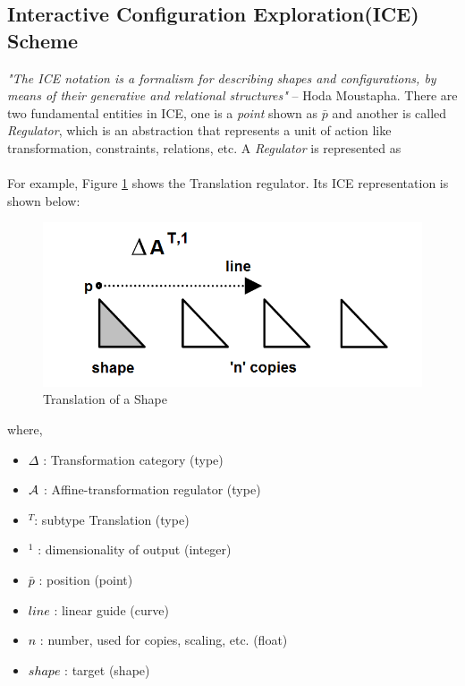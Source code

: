 \subsection{Interactive Configuration Exploration(ICE) Scheme} \label{sec:abstraction:ice}

{\em "The ICE notation is a formalism for describing shapes and  configurations,  by  means  of  their  generative  and  relational  structures"} -- Hoda Moustapha\cite{Hoda2005}.  There are two fundamental entities in ICE, one is a {\em point} shown as $\bar{p}$ and another is called {\em Regulator}, which is an abstraction that represents a unit of action like transformation, constraints, relations, etc. A {\em Regulator} is represented as \\



{}\\

	 For example, Figure \ref{fig:abstraction:hodatranslate} shows the Translation regulator. Its ICE representation is shown below:

	
\begin{figure}[!h]
\centering \includegraphics[width=0.5\linewidth]{../Common/images/hodatranslate} 
\caption{Translation of a Shape}
\label{fig:abstraction:hodatranslate}
\end{figure}

	
	where,
		\begin{itemize}[noitemsep,topsep=0pt,parsep=0pt,partopsep=0pt]
		\item 	\textcolor{black}{$\Delta$} : Transformation category (type)
	     	\item 	\textcolor{black}{${\bf \mathcal{A}}$} : Affine-transformation regulator (type)
		\item  	\textcolor{black}{$^T$}: subtype Translation (type)
		 \item 	\textcolor{black}{$^1$} : dimensionality of output (integer)
	        \item 	\textcolor{black}{ $\bar{p}$} : position (point)
  		\item  	\textcolor{black}{$line$} : linear guide (curve)
		 \item  	\textcolor{black}{$n$} : number, used for copies, scaling, etc. (float)
		 \item  	\textcolor{black}{$shape$} : target (shape)
		\end{itemize}

